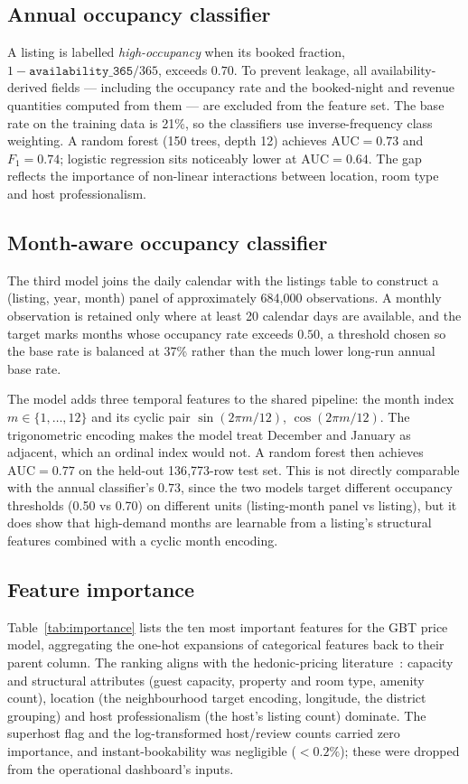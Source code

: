 \documentclass[conference]{IEEEtran}
\begin{document}
\subsection{Annual occupancy classifier}
A listing is labelled \emph{high-occupancy} when its booked fraction, $1 - \texttt{availability\_365}/365$, exceeds $0.70$. To prevent leakage, all availability-derived fields --- including the occupancy rate and the booked-night and revenue quantities computed from them --- are excluded from the feature set. The base rate on the training data is 21\%, so the classifiers use inverse-frequency class weighting. A random forest (150 trees, depth 12) achieves $\text{AUC}=0.73$ and $F_1=0.74$; logistic regression sits noticeably lower at $\text{AUC}=0.64$. The gap reflects the importance of non-linear interactions between location, room type and host professionalism.

\subsection{Month-aware occupancy classifier}
The third model joins the daily calendar with the listings table to construct a (listing, year, month) panel of approximately 684{,}000 observations. A monthly observation is retained only where at least 20 calendar days are available, and the target marks months whose occupancy rate exceeds $0.50$, a threshold chosen so the base rate is balanced at 37\% rather than the much lower long-run annual base rate.

The model adds three temporal features to the shared pipeline: the month index $m \in \{1,\dots,12\}$ and its cyclic pair $\sin(2\pi m/12)$, $\cos(2\pi m/12)$. The trigonometric encoding makes the model treat December and January as adjacent, which an ordinal index would not. A random forest then achieves $\text{AUC}=0.77$ on the held-out 136{,}773-row test set. This is not directly comparable with the annual classifier's $0.73$, since the two models target different occupancy thresholds (0.50 vs 0.70) on different units (listing-month panel vs listing), but it does show that high-demand months are learnable from a listing's structural features combined with a cyclic month encoding.

\subsection{Feature importance}
\label{sec:importance}
Table~\ref{tab:importance} lists the ten most important features for the GBT price model, aggregating the one-hot expansions of categorical features back to their parent column. The ranking aligns with the hedonic-pricing literature~\cite{wang2017price,chen2017consumer}: capacity and structural attributes (guest capacity, property and room type, amenity count), location (the neighbourhood target encoding, longitude, the district grouping) and host professionalism (the host's listing count) dominate. The superhost flag and the log-transformed host/review counts carried zero importance, and instant-bookability was negligible ($<0.2\%$); these were dropped from the operational dashboard's inputs.
\end{document}
